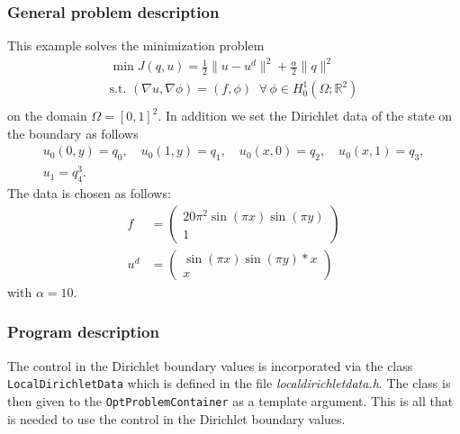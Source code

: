 \subsubsection{General problem description}
This example solves the minimization problem
\begin{gather*}
\min J(q,u) = \frac{1}{2} \|u-u^d\|^2 + \frac{\alpha}{2}\|q\|^2\\
\text{s.t. } (\nabla u,\nabla \phi) = (f,\phi)\;\;\forall\,\phi \in H^1_0(\Omega; \mathbb R^2)\\
\end{gather*}
on the domain $\Omega = [0,1]^2$. In addition we set the Dirichlet data of the state on the boundary as follows
\begin{gather*}
 u_0(0,y) = q_0,\quad u_0(1,y) = q_1,\quad u_0(x,0) = q_2,\quad u_0(x,1) = q_3,\\
 u_1 = q_4^3.
\end{gather*}
The data is chosen as follows:
\begin{align*}
 f &= \left(\begin{matrix}20\pi^2  \sin( \pi x) \sin(\pi y)\\1 \end{matrix}\right)\\
 u^d&= \left(\begin{matrix}\sin( \pi x) \sin(\pi y)*x\\x \end{matrix}\right)
\end{align*}
with $\alpha = 10$.
\subsubsection{Program description}
The control in the Dirichlet boundary values is incorporated via the
class \texttt{LocalDirichletData} which is defined in the
file \textit{localdirichletdata.h}. The class is then given to
the \texttt{OptProblemContainer} as a template argument. This is all that is
needed to use the control in the Dirichlet boundary values. 
